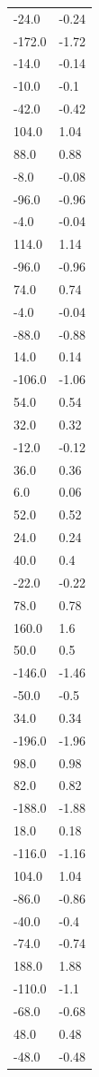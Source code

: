 \begin{longtable}{ll}
-24.0 & -0.24 \\
-172.0 & -1.72 \\
-14.0 & -0.14 \\
-10.0 & -0.1 \\
-42.0 & -0.42 \\
104.0 & 1.04 \\
88.0 & 0.88 \\
-8.0 & -0.08 \\
-96.0 & -0.96 \\
-4.0 & -0.04 \\
114.0 & 1.14 \\
-96.0 & -0.96 \\
74.0 & 0.74 \\
-4.0 & -0.04 \\
-88.0 & -0.88 \\
14.0 & 0.14 \\
-106.0 & -1.06 \\
54.0 & 0.54 \\
32.0 & 0.32 \\
-12.0 & -0.12 \\
36.0 & 0.36 \\
6.0 & 0.06 \\
52.0 & 0.52 \\
24.0 & 0.24 \\
40.0 & 0.4 \\
-22.0 & -0.22 \\
78.0 & 0.78 \\
160.0 & 1.6 \\
50.0 & 0.5 \\
-146.0 & -1.46 \\
-50.0 & -0.5 \\
34.0 & 0.34 \\
-196.0 & -1.96 \\
98.0 & 0.98 \\
82.0 & 0.82 \\
-188.0 & -1.88 \\
18.0 & 0.18 \\
-116.0 & -1.16 \\
104.0 & 1.04 \\
-86.0 & -0.86 \\
-40.0 & -0.4 \\
-74.0 & -0.74 \\
188.0 & 1.88 \\
-110.0 & -1.1 \\
-68.0 & -0.68 \\
48.0 & 0.48 \\
-48.0 & -0.48 \\

\end{longtable}
